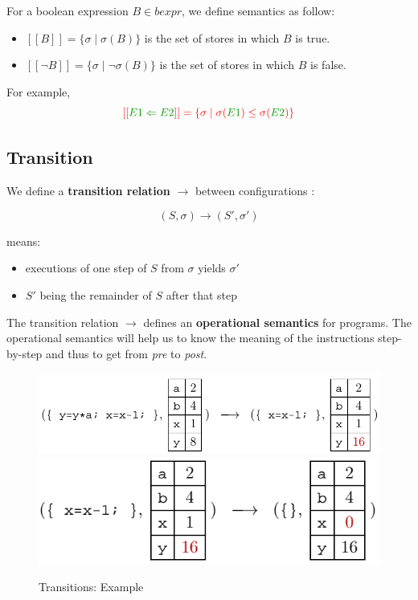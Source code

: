 \documentclass[12pt, a4paper]{book}
\begin{document}
For a boolean expression $B \in bexpr$, we define semantics as follow:

\begin{itemize}
    \item $[[B]] = \{\sigma \mid \sigma(B)\}$ is the set of stores in which $B$
    is true.
    \item $[[\lnot B]] = \{\sigma \mid \lnot \sigma(B)\}$ is the set of stores
    in which $B$ is false.
\end{itemize}

For example,
$$
\textcolor{red}{[[}\textcolor{green!60!black}{E1<=E2}\textcolor{red}{]] = \{\sigma \mid \sigma(}\textcolor{green!60!black}{E1}\textcolor{red}{) \le \sigma(}\textcolor{green!60!black}{E2}\textcolor{red}{)\}}
$$

\subsection{Transition}
\label{sub:Transition}

We define a \textbf{transition relation} $\longrightarrow$ between
configurations :

$$(S,\sigma) \longrightarrow (S',\sigma')$$

means:

\begin{itemize}
    \item executions of one step of $S$ from $\sigma$ yields $\sigma'$
    \item $S'$ being the remainder of $S$ after that step
\end{itemize}

The transition relation $\longrightarrow$ defines an \textbf{operational
semantics} for programs. The operational semantics will help us to know the
meaning of the instructions step-by-step and thus to get from \textit{pre} to
\textit{post}.

\begin{figure}[!ht]
    \centering
    \includegraphics[width=\linewidth]{transition1.png}
    \includegraphics[width=\linewidth]{transition2.png}
    \caption{Transitions: Example}
\end{figure}
\end{document}
